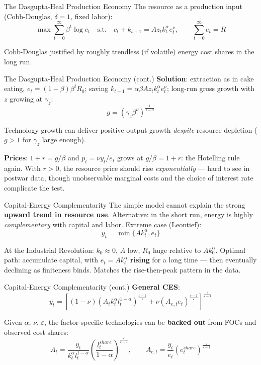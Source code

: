 \documentclass[blue]{beamer}
\begin{document}
\begin{frame}{The Dasgupta-Heal Production Economy}
The resource as a production input (Cobb-Douglas, $\delta = 1$, fixed labor):
\[
\max\sum_{t=0}^{\infty}\beta^t\log c_t \quad \text{s.t.} \quad c_t + k_{t+1} = Az_tk_t^{\alpha}e_t^{\nu}, \qquad \sum_{t=0}^{\infty}e_t = R
\]

Cobb-Douglas justified by roughly trendless (if volatile) energy cost shares in the long run.

\end{frame}

\begin{frame}{The Dasgupta-Heal Production Economy (cont.)}
\bigskip
\textbf{Solution}: extraction as in cake eating, $e_t = (1-\beta)\beta^tR_0$; saving $k_{t+1} = \alpha\beta Az_tk_t^{\alpha}e_t^{\nu}$; long-run gross growth with $z$ growing at $\gamma_z$:
\[
g = \left(\gamma_z\beta^{\nu}\right)^{\frac{1}{1-\alpha}}
\]

Technology growth can deliver positive output growth \emph{despite} resource depletion ($g > 1$ for $\gamma_z$ large enough).

\bigskip
\textbf{Prices}: $1 + r = g/\beta$ and $p_t = \nu y_t/e_t$ grows at $g/\beta = 1+r$: the Hotelling rule again. With $r > 0$, the resource price should rise \emph{exponentially} --- hard to see in postwar data, though unobservable marginal costs and the choice of interest rate complicate the test.
\end{frame}

\begin{frame}{Capital-Energy Complementarity}
The simple model cannot explain the strong \textbf{upward trend in resource use}. Alternative: in the short run, energy is highly \emph{complementary} with capital and labor. Extreme case (Leontief):
\[
y_t = \min\{Ak_t^{\alpha}, e_t\}
\]

At the Industrial Revolution: $k_0 \approx 0$, $A$ low, $R_0$ huge relative to $Ak_0^{\alpha}$. Optimal path: accumulate capital, with $e_t = Ak_t^{\alpha}$ \textbf{rising} for a long time --- then eventually declining as finiteness binds. Matches the rise-then-peak pattern in the data.

\end{frame}

\begin{frame}{Capital-Energy Complementarity (cont.)}
\bigskip
\textbf{General CES}:
\[
y_t = \left[(1-\nu)\left(A_tk_t^{\alpha}l_t^{1-\alpha}\right)^{\frac{\varepsilon-1}{\varepsilon}} + \nu\left(A_{e}{}_{,t}e_t\right)^{\frac{\varepsilon-1}{\varepsilon}}\right]^{\frac{\varepsilon}{\varepsilon-1}}
\]

Given $\alpha$, $\nu$, $\varepsilon$, the factor-specific technologies can be \textbf{backed out} from FOCs and observed cost shares:
\[
A_t = \frac{y_t}{k_t^{\alpha}l_t^{1-\alpha}}\left(\frac{l_t^{share}}{1-\alpha}\right)^{\frac{\varepsilon}{\varepsilon-1}}, \qquad A_{e,t} = \frac{y_t}{e_t}\left(e_t^{share}\right)^{\frac{\varepsilon}{\varepsilon-1}}
\]
\end{frame}
\end{document}
